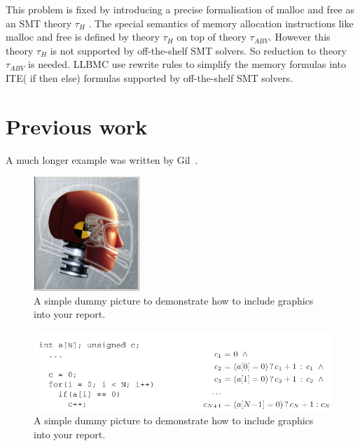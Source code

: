 \documentclass[14pt]{article}
\begin{document}
This problem is fixed by introducing a precise formalisation of malloc and free as an SMT theory \(\tau_{H}\)  \cite{llbmc2}. The special semantics of memory allocation instructions like malloc and free is defined by theory \(\tau_{H}\) on top of theory \(\tau_{ABV}\). However this theory \(\tau_{H}\)  is not supported by off-the-shelf SMT solvers. So reduction to theory \(\tau_{ABV}\) is needed.  LLBMC use rewrite rules to simplify the memory formulas into ITE( if then else) formulas supported by off-the-shelf SMT solvers.


\section{Previous work}\label{previous work}
A much longer \LaTeXe{} example was written by Gil~\cite{bmc}.
\begin{figure}[htb!]
  \begin{centering}
    \includegraphics[width=4cm]{figures/dummy.jpg}\par
  \end{centering}
  \caption{A simple dummy picture to demonstrate how
           to include graphics into your report.}
  \label{fig:dummy}
\end{figure}
\begin{figure}[htb!]
  \begin{centering}
    \includegraphics[width=\textwidth]{figures/bmc-example-1}\par
  \end{centering}
  \caption{A simple dummy picture to demonstrate how
           to include graphics into your report.}
  \label{fig:dummy}
\end{figure}
\end{document}
